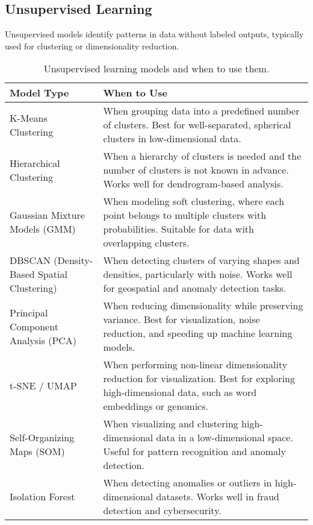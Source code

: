 \documentclass[12pt,openany, draft]{book}
\begin{document}
\subsection{Unsupervised Learning}

Unsupervised models identify patterns in data without labeled outputs, 
typically used for clustering or dimensionality reduction.

\begin{table}[H]
    \centering
    \small
    \renewcommand{\arraystretch}{1.3} %
    \begin{tabular}{|l|p{8cm}|}
        \hline
        \textbf{Model Type} & \textbf{When to Use} \\
        \hline
        K-Means Clustering & When grouping data into a predefined number of clusters. Best for well-separated, spherical clusters in low-dimensional data. \\
        \hline
        Hierarchical Clustering & When a hierarchy of clusters is needed and the number of clusters is not known in advance. Works well for dendrogram-based analysis. \\
        \hline
        Gaussian Mixture Models (GMM) & When modeling soft clustering, where each point belongs to multiple clusters with probabilities. Suitable for data with overlapping clusters. \\
        \hline
        DBSCAN (Density-Based Spatial Clustering) & When detecting clusters of varying shapes and densities, particularly with noise. Works well for geospatial and anomaly detection tasks. \\
        \hline
        Principal Component Analysis (PCA) & When reducing dimensionality while preserving variance. Best for visualization, noise reduction, and speeding up machine learning models. \\
        \hline
        t-SNE / UMAP & When performing non-linear dimensionality reduction for visualization. Best for exploring high-dimensional data, such as word embeddings or genomics. \\
        \hline
        Self-Organizing Maps (SOM) & When visualizing and clustering high-dimensional data in a low-dimensional space. Useful for pattern recognition and anomaly detection. \\
        \hline
        Isolation Forest & When detecting anomalies or outliers in high-dimensional datasets. Works well in fraud detection and cybersecurity. \\
        \hline
    \end{tabular}
    \caption{Unsupervised learning models and when to use them.}
\end{table}
\end{document}
